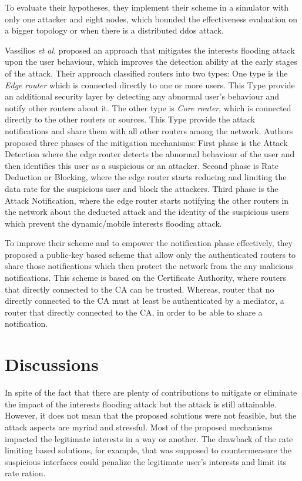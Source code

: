 \documentclass[conference]{IEEEtran}
\begin{document}
To evaluate their hypotheses, they implement their scheme in a simulator with only one attacker and eight nodes, which bounded the effectiveness evaluation on a bigger topology or when there is a distributed ddos attack.

Vassilios \textit{et al}.\cite{Vassilakis2015} proposed an approach that mitigates the interests flooding attack upon the user behaviour, which improves the detection ability at the early stages of the attack. Their approach classified routers into two types: One type is the \textit{Edge router} which is connected directly to one or more users. This Type provide an additional security layer by detecting any abnormal user's behaviour and notify other routers about it. The other type is \textit{Core router}, which is connected directly to the other routers or sources. This Type provide the attack notifications and share them with all other routers among the network. Authors proposed three phases of the mitigation mechanisms: First phase is the Attack Detection where the edge router detects the abnormal behaviour of the user and then identifies this user as a suspicious or an attacker. Second phase is Rate Deduction or Blocking, where the edge router starts reducing and limiting the data rate for the suspicious user and block the attackers. Third phase is the Attack Notification, where the edge router starts notifying the other routers in the network about the deducted attack and the identity of the suspicious users which prevent the dynamic/mobile interests flooding attack.


To improve their scheme and to empower the notification phase effectively, they proposed a public-key based scheme that allow only the authenticated routers to share those notifications which then protect the network from the any malicious notifications. This scheme is based on the Certificate Authority, where routers that directly connected to the CA can be trusted. Whereas, router that no directly connected to the CA must at least be authenticated by a mediator, a router that directly connected to the CA, in order to be able to share a notification.      





\section{Discussions}

In spite of the fact that there are plenty of contributions to mitigate or eliminate the impact of the interests flooding attack but the attack is still attainable. However, it does not mean that the proposed solutions were not feasible, but the attack aspects are myriad and stressful. Most of the proposed mechanisms impacted the legitimate interests in a way or another. The drawback of the rate limiting based solutions, for example, that was supposed to countermeasure the suspicious interfaces could penalize the legitimate user's interests and limit its rate ration.   
 
\end{document}
